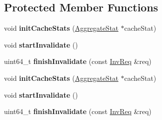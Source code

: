 \subsection*{Protected Member Functions}
\begin{DoxyCompactItemize}
\item 
\hypertarget{classCache_a6f04561d53efc7623c809e6c885d8c09}{void {\bfseries init\-Cache\-Stats} (\hyperlink{classAggregateStat}{Aggregate\-Stat} $\ast$cache\-Stat)}\label{classCache_a6f04561d53efc7623c809e6c885d8c09}

\item 
\hypertarget{classCache_acd207b095f2b950d8887a1f9614f994b}{void {\bfseries start\-Invalidate} ()}\label{classCache_acd207b095f2b950d8887a1f9614f994b}

\item 
\hypertarget{classCache_abde65d6c87557ccdf3557e6da05dcb7c}{uint64\-\_\-t {\bfseries finish\-Invalidate} (const \hyperlink{structInvReq}{Inv\-Req} \&req)}\label{classCache_abde65d6c87557ccdf3557e6da05dcb7c}

\item 
\hypertarget{classCache_a6f04561d53efc7623c809e6c885d8c09}{void {\bfseries init\-Cache\-Stats} (\hyperlink{classAggregateStat}{Aggregate\-Stat} $\ast$cache\-Stat)}\label{classCache_a6f04561d53efc7623c809e6c885d8c09}

\item 
\hypertarget{classCache_acd207b095f2b950d8887a1f9614f994b}{void {\bfseries start\-Invalidate} ()}\label{classCache_acd207b095f2b950d8887a1f9614f994b}

\item 
\hypertarget{classCache_abde65d6c87557ccdf3557e6da05dcb7c}{uint64\-\_\-t {\bfseries finish\-Invalidate} (const \hyperlink{structInvReq}{Inv\-Req} \&req)}\label{classCache_abde65d6c87557ccdf3557e6da05dcb7c}

\end{DoxyCompactItemize}
